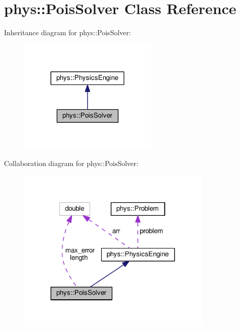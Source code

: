 \hypertarget{classphys_1_1PoisSolver}{}\section{phys\+:\+:Pois\+Solver Class Reference}
\label{classphys_1_1PoisSolver}


Inheritance diagram for phys\+:\+:Pois\+Solver\+:
\nopagebreak
\begin{figure}[H]
\begin{center}
\leavevmode
\includegraphics[width=189pt]{classphys_1_1PoisSolver__inherit__graph}
\end{center}
\end{figure}


Collaboration diagram for phys\+:\+:Pois\+Solver\+:
\nopagebreak
\begin{figure}[H]
\begin{center}
\leavevmode
\includegraphics[width=264pt]{classphys_1_1PoisSolver__coll__graph}
\end{center}
\end{figure}
